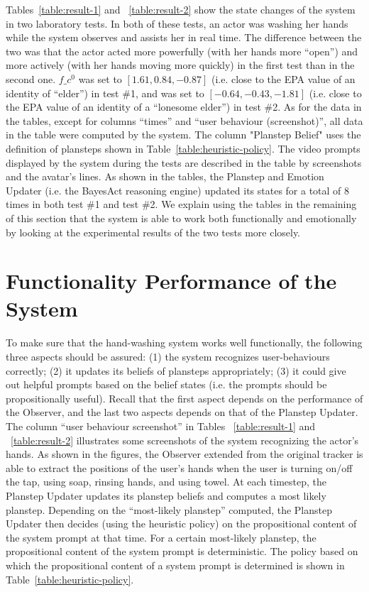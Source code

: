 Tables~\ref{table:result-1} and ~\ref{table:result-2} show the state changes of the system in two laboratory tests. In both of these tests, an actor was washing her hands while the system observes and assists her in real time. The difference between the two was that the actor acted more powerfully (with her hands more ``open'') and more actively (with her hands moving more quickly) in the first test than in the second one. $f\_c^0$ was set to $[1.61, 0.84, -0.87]$ (i.e. close to the EPA value of an identity of ``elder'') in test \#1, and was set to $[-0.64, -0.43, -1.81]$ (i.e. close to the EPA value of an identity of a ``lonesome elder'') in test \#2. As for the data in the tables, except for columns ``times'' and ``user behaviour (screenshot)'', all data in the table were computed by the system. The column "Planstep Belief" uses the definition of plansteps shown in Table~\ref{table:heuristic-policy}. The video prompts displayed by the system during the tests are described in the table by screenshots and the avatar's lines. As shown in the tables, the Planstep and Emotion Updater (i.e. the BayesAct reasoning engine) updated its states for a total of 8 times in both test \#1 and test \#2. We explain using the tables in the remaining of this section that the system is able to work both functionally and emotionally by looking at the experimental results of the two tests more closely.

\section{Functionality Performance of the System}

To make sure that the hand-washing system works well functionally, the following three aspects should be assured: (1) the system recognizes user-behaviours correctly; (2) it updates its beliefs of plansteps appropriately; (3) it could give out helpful prompts based on the belief states (i.e. the prompts should be propositionally useful). Recall that the first aspect depends on the performance of the Observer, and the last two aspects depends on that of the Planstep Updater. The column ``user behaviour screenshot'' in Tables ~\ref{table:result-1} and ~\ref{table:result-2} illustrates some screenshots of the system recognizing the actor's hands. As shown in the figures, the Observer extended from the original tracker is able to extract the positions of the user's hands when the user is turning on/off the tap, using soap, rinsing hands, and using towel. At each timestep, the Planstep Updater updates its planstep beliefs and computes a most likely planstep. Depending on the ``most-likely planstep'' computed, the Planstep Updater then decides (using the heuristic policy) on the propositional content of the system prompt at that time. For a certain most-likely planstep, the propositional content of the system prompt is deterministic. The policy based on which the propositional content of a system prompt is determined is shown in Table~\ref{table:heuristic-policy}.

